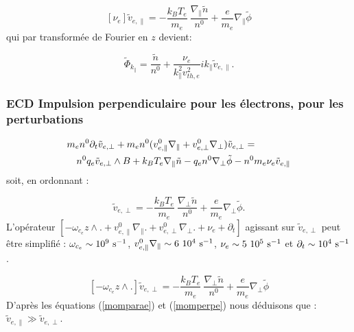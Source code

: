 \documentclass{book}
\begin{document}
\begin{equation}\label{momparae}
[\nu_e]\tilde{v}_{e,\parallel}
=-\frac{k_B T_e}{m_e}\ \frac{\nabla_\parallel \tilde n}{n^0}
+\frac{e}{m_e}\nabla_\parallel
\tilde\phi
\end{equation}
qui par transform\'ee de Fourier en $z$ devient:


\begin{equation}\label{empep}
\tilde\Phi_{k_\parallel}=\frac{\tilde n}{n^0}
+\frac{\nu_e}{k_\parallel^2 v_{th,e}^2}
i k_\parallel \tilde v_{e,\parallel}.
\end{equation}


\subsubsection{ECD Impulsion perpendiculaire pour les \'electrons,  pour les perturbations}

\begin{eqnarray}
\lefteqn{m_en^0\partial_t\tilde{v}_{e,\perp}
+m_en^0(v_{e,\parallel}^0\nabla_\parallel
+v_{e,\perp}^0\nabla_\perp)\tilde{v}_{e,\perp}
=}\nonumber\\&&n^0q_e\tilde v_{e,\perp}\wedge B
+ k_B T_e \nabla_\parallel\tilde n - q_en^0\nabla_\perp\tilde\phi
-n^0m_e\nu_e \tilde v_{e,\parallel}
\end{eqnarray}
soit, en ordonnant :

\begin{equation}
[-\omega_{c_e}z\wedge.
+v_{e,\parallel}^0\nabla_\parallel.
+v_{e,\perp}^0\nabla_\perp.
+\nu_e+\partial_t ]    \tilde{v}_{e,\perp}
=-\frac{k_B T_e}{m_e}\ \frac{\nabla_\perp \tilde n}{n^0}
+\frac{e}{m_e}\nabla_\perp\tilde\phi.
\end{equation}
L'op\'erateur  $[-\omega_{c_e}z\wedge.+v_{e,\parallel}^0\nabla_\parallel.+v_{e,\perp}^0\nabla_\perp.
+\nu_e+\partial_t ] $
agissant sur  $\tilde{v}_{e,\perp}$ peut \^etre simplifi\'e :
$\omega_{c_e}\sim10^9\ {\rm s}^{-1}$,
$v_{e,\parallel}^0\nabla_\parallel\sim 6\ 10^{4}\ {\rm s}^{-1}$,
$\nu_e\sim 5\ 10^{5}\ {\rm s}^{-1}$
et $\partial_t\sim 10^{4}\ {\rm s}^{-1}$.

\begin{equation}\label{momperpe}
[-\omega_{c_e}z\wedge.]\tilde{v}_{e,\perp}
=-\frac{k_B T_e}{m_e}\ \frac{\nabla_\perp \tilde n}{n^0}
+\frac{e}{m_e}\nabla_\perp\tilde\phi
\end{equation}
D'apr\`es les  \'equations (\ref{momparae}) et (\ref{momperpe}) nous
d\'eduisons 
que : $\tilde{v}_{e,\parallel}\gg \tilde{v}_{e,\perp}$.
\end{document}
